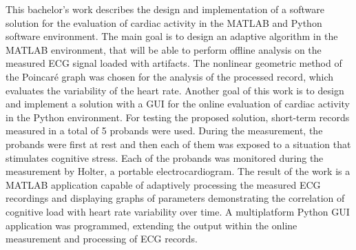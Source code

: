 This bachelor's work describes the design and implementation of a software
solution for the evaluation of cardiac activity in the MATLAB and Python
software environment. The main goal is to design an adaptive algorithm in the
MATLAB environment, that will be able to perform offline analysis on the
measured ECG signal loaded with artifacts. The nonlinear geometric method of the
Poincaré graph was chosen for the analysis of the processed record, which
evaluates the variability of the heart rate. Another goal of this work is to
design and implement a solution with a GUI for the online evaluation of cardiac
activity in the Python environment. For testing the proposed solution,
short-term records measured in a total of 5 probands were used. During the
measurement, the probands were first at rest and then each of them was exposed
to a situation that stimulates cognitive stress. Each of the probands was
monitored during the measurement by Holter, a portable electrocardiogram. The
result of the work is a MATLAB application capable of adaptively processing the
measured ECG recordings and displaying graphs of parameters demonstrating the
correlation of cognitive load with heart rate variability over time. A
multiplatform Python GUI application was programmed, extending the output within
the online measurement and processing of ECG records.